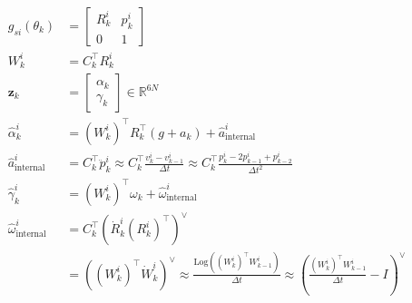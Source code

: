 \documentclass[11pt]{article}
\begin{document}
\begin{align*}
    g_{si}(\theta_k) &= \begin{bmatrix}
        R_k^i & p_k^i \\
        0 & 1
    \end{bmatrix} \\
    W_k^i &= C_k^\top R_k^i \\
    \mathbf{z}_k &= \begin{bmatrix}
        \alpha_k \\ \gamma_k
    \end{bmatrix} \in \mathbb{R}^{6N} \\
    \hat{\alpha}_k^i &= (W_k^i)^\top R_k^\top (g + a_k) + \hat{a}^i_{\text{internal}} \\
    \hat{a}^i_{\text{internal}} &= C_k^\top \ddot{p}_k^i \approx C_k^\top \frac{v_k^i - v_{k-1}^i}{\Delta t} \approx C_k^\top \frac{p_k^i - 2p_{k-1}^i + p_{k-2}^i}{\Delta t^2} \\
    \hat{\gamma}_k^i &= (W_k^i)^\top \omega_k + \hat{\omega}^i_{\text{internal}} \\
    \hat{\omega}^i_{\text{internal}} &= C_k^\top\left(\dot{R}_k^i(R_{k}^i)^\top\right)^\vee \\
    &= \left((W_k^i)^\top \dot{W}_{k}^i\right)^\vee \approx \frac{\text{Log}\left((W_k^i)^\top W_{k-1}^i\right)}{\Delta t} \approx \left(\frac{(W_k^i)^\top W_{k-1}^i}{\Delta t} - I\right)^\vee
\end{align*}
\end{document}
